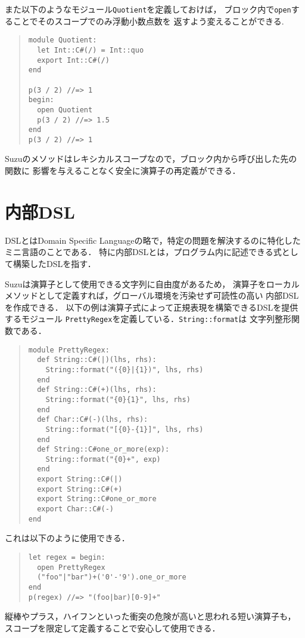\documentclass[a4paper,11pt,dvipdfmx]{jreport}
\begin{document}
また以下のようなモジュール\verb|Quotient|を定義しておけば，
ブロック内で\verb|open|することでそのスコープでのみ浮動小数点数を
返すよう変えることができる.
\begin{quote}
\begin{verbatim}
module Quotient:
  let Int::C#(/) = Int::quo
  export Int::C#(/)
end

p(3 / 2) //=> 1
begin:
  open Quotient
  p(3 / 2) //=> 1.5
end
p(3 / 2) //=> 1
\end{verbatim}
\end{quote}

Suzuのメソッドはレキシカルスコープなので，ブロック内から呼び出した先の関数に
影響を与えることなく安全に演算子の再定義ができる．


\section{内部DSL}

DSLとはDomain Specific Languageの略で，特定の問題を解決するのに特化した
ミニ言語のことである．
特に内部DSLとは，プログラム内に記述できる式として構築したDSLを指す．

Suzuは演算子として使用できる文字列に自由度があるため，
演算子をローカルメソッドとして定義すれば，グローバル環境を汚染せず可読性の高い
内部DSLを作成できる．
以下の例は演算子式によって正規表現を構築できるDSLを提供するモジュール
\verb|PrettyRegex|を定義している．\verb|String::format|は
文字列整形関数である．
\begin{quote}
\begin{verbatim}
module PrettyRegex:
  def String::C#(|)(lhs, rhs):
    String::format("({0}|{1})", lhs, rhs)
  end
  def String::C#(+)(lhs, rhs):
    String::format("{0}{1}", lhs, rhs)
  end
  def Char::C#(-)(lhs, rhs):
    String::format("[{0}-{1}]", lhs, rhs)
  end
  def String::C#one_or_more(exp):
    String::format("{0}+", exp)
  end
  export String::C#(|)
  export String::C#(+)
  export String::C#one_or_more
  export Char::C#(-)
end
\end{verbatim}
\end{quote}
これは以下のように使用できる．
\begin{quote}
\begin{verbatim}
let regex = begin:
  open PrettyRegex
  ("foo"|"bar")+('0'-'9').one_or_more
end
p(regex) //=> "(foo|bar)[0-9]+"
\end{verbatim}
\end{quote}
縦棒やプラス，ハイフンといった衝突の危険が高いと思われる短い演算子も，
スコープを限定して定義することで安心して使用できる．
\end{document}
